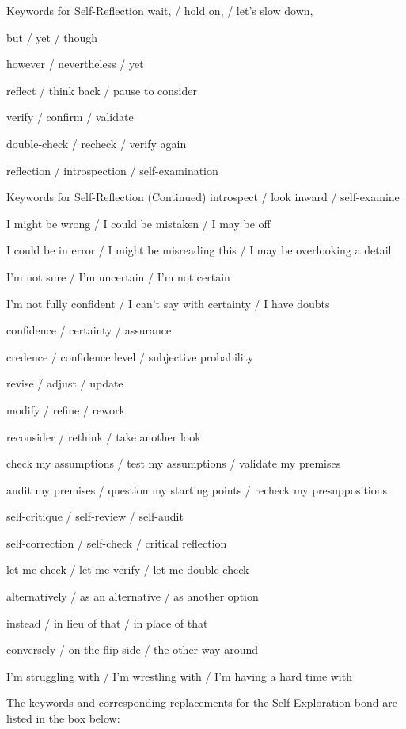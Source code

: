 \begin{PromptBox}{Keywords for Self-Reflection}
wait, / hold on, /  let's slow down,

but / yet / though

however / nevertheless / yet

reflect /  think back / pause to consider

verify / confirm / validate

double-check / recheck / verify again

reflection / introspection / self-examination
\end{PromptBox}
\begin{PromptBox}{Keywords for Self-Reflection (Continued)}
introspect / look inward / self-examine

I might be wrong / I could be mistaken / I may be off

I could be in error / I might be misreading this / I may be overlooking a detail

I'm not sure / I'm uncertain / I'm not certain

I'm not fully confident / I can't say with certainty / I have doubts

confidence / certainty / assurance

credence / confidence level / subjective probability

revise / adjust / update

modify / refine / rework

reconsider / rethink / take another look

check my assumptions / test my assumptions / validate my premises

audit my premises / question my starting points / recheck my presuppositions

self-critique / self-review / self-audit

self-correction / self-check / critical reflection

let me check / let me verify / let me double-check

alternatively / as an alternative / as another option

instead / in lieu of that / in place of that

conversely / on the flip side / the other way around

I'm struggling with / I’m wrestling with / I’m having a hard time with

\end{PromptBox}

The keywords and corresponding replacements for the Self-Exploration bond are listed in the box below:

